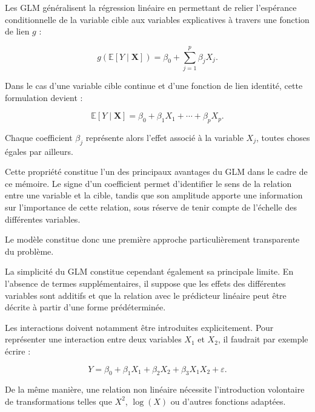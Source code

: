 Les GLM généralisent la régression linéaire en permettant de relier l'espérance conditionnelle de la variable cible aux variables explicatives à travers une fonction de lien $g$ :

\begin{equation}
    g\left(
    \mathbb{E}
    \left[
    Y \mid \mathbf{X}
    \right]
    \right)
    =
    \beta_0
    +
    \sum_{j=1}^{p}
    \beta_j X_j.
    \label{eq:glm}
\end{equation}

Dans le cas d'une variable cible continue et d'une fonction de lien identité, cette formulation devient :

\begin{equation}
    \mathbb{E}
    \left[
    Y \mid \mathbf{X}
    \right]
    =
    \beta_0
    +
    \beta_1X_1
    +
    \cdots
    +
    \beta_pX_p.
\end{equation}

Chaque coefficient $\beta_j$ représente alors l'effet associé à la variable $X_j$, toutes choses égales par ailleurs.

Cette propriété constitue l'un des principaux avantages du GLM dans le cadre de ce mémoire. Le signe d'un coefficient permet d'identifier le sens de la relation entre une variable et la cible, tandis que son amplitude apporte une information sur l'importance de cette relation, sous réserve de tenir compte de l'échelle des différentes variables.

Le modèle constitue donc une première approche particulièrement transparente du problème.

La simplicité du GLM constitue cependant également sa principale limite. En l'absence de termes supplémentaires, il suppose que les effets des différentes variables sont additifs et que la relation avec le prédicteur linéaire peut être décrite à partir d'une forme prédéterminée.

Les interactions doivent notamment être introduites explicitement. Pour représenter une interaction entre deux variables $X_1$ et $X_2$, il faudrait par exemple écrire :

\begin{equation}
    Y
    =
    \beta_0
    +
    \beta_1X_1
    +
    \beta_2X_2
    +
    \beta_3 X_1X_2
    +
    \varepsilon.
\end{equation}

De la même manière, une relation non linéaire nécessite l'introduction volontaire de transformations telles que $X^2$, $\log(X)$ ou d'autres fonctions adaptées.

